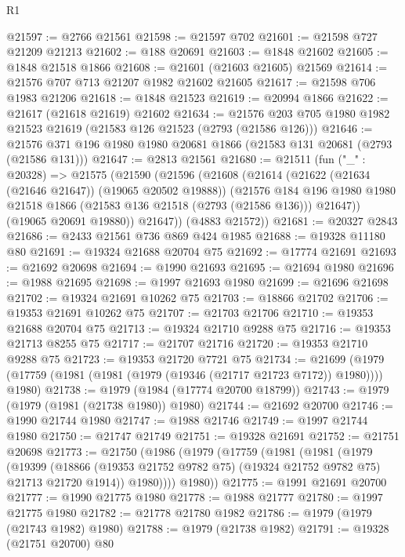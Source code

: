 \begin{lexlean}{R1}
\begin{coremodule}
@21597 := @2766 @21561
@21598 := @21597 @702
@21601 := @21598 @727 @21209 @21213
@21602 := @188 @20691
@21603 := @1848 @21602
@21605 := @1848 @21518 @1866
@21608 := @21601 (@21603 @21605) @21569
@21614 := @21576 @707 @713 @21207 @1982 @21602 @21605
@21617 := @21598 @706 @1983 @21206
@21618 := @1848 @21523
@21619 := @20994 @1866
@21622 := @21617 (@21618 @21619) @21602
@21634 := @21576 @203 @705 @1980 @1982 @21523 @21619 (@21583 @126 @21523 (@2793 (@21586 @126)))
@21646 := @21576 @371 @196 @1980 @1980 @20681 @1866 (@21583 @131 @20681 (@2793 (@21586 @131)))
@21647 := @2813 @21561
@21680 := @21511
    (fun ("_" : @20328) =>
    @21575
      (@21590
        (@21596
          (@21608
            (@21614
              (@21622 (@21634 (@21646 @21647)) (@19065 @20502 @19888))
              (@21576
                @184
                @196
                @1980
                @1980
                @21518
                @1866
                (@21583 @136 @21518 (@2793 (@21586 @136)))
                @21647))
            (@19065 @20691 @19880))
          @21647))
      (@4883 @21572))
@21681 := @20327 @2843
@21686 := @2433 @21561 @736 @869 @424 @1985
@21688 := @19328 @11180 @80
@21691 := @19324 @21688 @20704 @75
@21692 := @17774 @21691
@21693 := @21692 @20698
@21694 := @1990 @21693
@21695 := @21694 @1980
@21696 := @1988 @21695
@21698 := @1997 @21693 @1980
@21699 := @21696 @21698
@21702 := @19324 @21691 @10262 @75
@21703 := @18866 @21702
@21706 := @19353 @21691 @10262 @75
@21707 := @21703 @21706
@21710 := @19353 @21688 @20704 @75
@21713 := @19324 @21710 @9288 @75
@21716 := @19353 @21713 @8255 @75
@21717 := @21707 @21716
@21720 := @19353 @21710 @9288 @75
@21723 := @19353 @21720 @7721 @75
@21734 := @21699 (@1979 (@17759 (@1981 (@1981 (@1979 (@19346 (@21717 @21723 @7172)) @1980)))) @1980)
@21738 := @1979 (@1984 (@17774 @20700 @18799))
@21743 := @1979 (@1979 (@1981 (@21738 @1980)) @1980)
@21744 := @21692 @20700
@21746 := @1990 @21744 @1980
@21747 := @1988 @21746
@21749 := @1997 @21744 @1980
@21750 := @21747 @21749
@21751 := @19328 @21691
@21752 := @21751 @20698
@21773 := @21750
    (@1986
      (@1979
        (@17759
          (@1981
            (@1981
              (@1979
                (@19399
                  (@18866 (@19353 @21752 @9782 @75) (@19324 @21752 @9782 @75) @21713 @21720 @1914))
                @1980))))
        @1980))
@21775 := @1991 @21691 @20700
@21777 := @1990 @21775 @1980
@21778 := @1988 @21777
@21780 := @1997 @21775 @1980
@21782 := @21778 @21780 @1982
@21786 := @1979 (@1979 (@21743 @1982) @1980)
@21788 := @1979 (@21738 @1982)
@21791 := @19328 (@21751 @20700) @80

\end{coremodule}
\end{lexlean}
